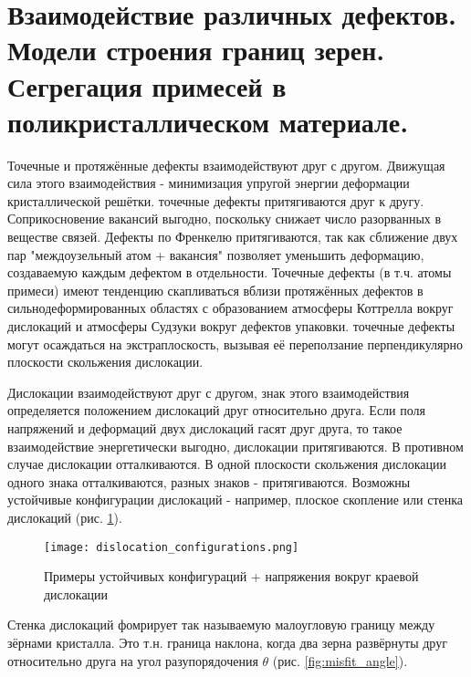 \section{Взаимодействие различных дефектов. Модели строения границ зерен.
Сегрегация примесей в поликристаллическом материале.}
Точечные и протяжённые дефекты взаимодействуют друг с другом. Движущая сила этого взаимодействия - минимизация упругой энергии деформации кристаллической решётки. точечные дефекты притягиваются друг к другу. Соприкосновение вакансий выгодно, поскольку снижает число разорванных в веществе связей. Дефекты по Френкелю притягиваются, так как сближение двух пар "междоузельный атом + вакансия" позволяет уменьшить деформацию, создаваемую каждым дефектом в отдельности. Точечные дефекты (в т.ч. атомы примеси) имеют тенденцию скапливаться вблизи протяжённых дефектов в сильнодеформированных областях с образованием атмосферы Коттрелла вокруг дислокаций и атмосферы Судзуки вокруг дефектов упаковки. точечные дефекты могут осаждаться на экстраплоскость, вызывая её переползание перпендикулярно плоскости скольжения дислокации.
\par
Дислокации взаимодействуют друг с другом, знак этого взаимодействия определяется положением дислокаций друг относительно друга. Если поля напряжений и деформаций двух дислокаций гасят друг друга, то такое взаимодействие энергетически выгодно, дислокации притягиваются. В противном случае дислокации отталкиваются. В одной плоскости скольжения дислокации одного знака отталкиваются, разных знаков - притягиваются. Возможны устойчивые конфигурации дислокаций - например, плоское скопление или стенка дислокаций (рис. \ref{fig:dislocation_configurations}).
\begin{figure}[h!]
\centering
\texttt{[image: dislocation\_configurations.png]}\caption{Примеры устойчивых конфигураций + напряжения вокруг краевой дислокации} \label{fig:dislocation_configurations}
\end{figure} 
\par
Стенка дислокаций фомрирует так называемую малоугловую границу между зёрнами кристалла. Это т.н. граница наклона, когда два зерна развёрнуты друг относительно друга на угол разупорядочения $\theta$ (рис. \ref{fig:misfit_angle}).

